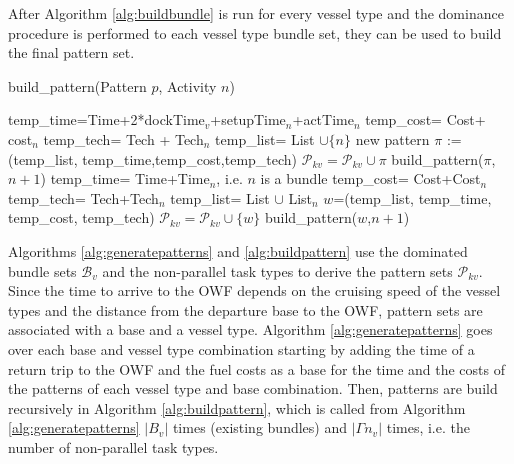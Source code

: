After Algorithm \ref{alg:buildbundle} is run for every vessel type and the dominance procedure is performed to each vessel type bundle set, they can be used to build the final pattern set. 
\begin{algorithm}[h]
	\caption{build\_pattern(Pattern $p$, Activity $n$)}
	\label{alg:buildpattern}
	\begin{algorithmic}
		\medskip
		\STATE temp\_time=Time+2*dockTime$_v$+setupTime$_n$+actTime$_n$
		\STATE temp\_cost= Cost+ cost$_n$
		\STATE temp\_tech= Tech + Tech$_n$
		\STATE temp\_list= List $\cup \{n\}$
		\STATE new pattern $\pi$ := (temp\_list, temp\_time,temp\_cost,temp\_tech)
		\STATE $\mathcal{P}_{kv}= \mathcal{P}_{kv}\cup \pi$ 
		\STATE build\_pattern($\pi$,$n+1$)
		\ENDIF
		\ELSE 
		\STATE temp\_time= Time+Time$_n$, i.e. $n$ is a bundle
		\STATE temp\_cost= Cost+Cost$_n$
		\STATE temp\_tech= Tech+Tech$_n$
		\STATE temp\_list= List $\cup$ List$_n$
		\STATE $w$=(temp\_list, temp\_time, temp\_cost, temp\_tech)
		\STATE $\mathcal{P}_{kv}= \mathcal{P}_{kv}\cup \{w\}$
		\STATE build\_pattern($w$,$n+1$)
		\ENDIF
		\ENDIF
	\end{algorithmic}
\end{algorithm}
Algorithms \ref{alg:generatepatterns} and \ref{alg:buildpattern} use the dominated bundle sets $\mathcal B_v$ and the non-parallel task types to derive the pattern sets $\mathcal P_{kv}$. Since the time to arrive to the OWF depends on the cruising speed of the vessel types and the distance from the departure base to the OWF, pattern sets are associated with a base and a vessel type. Algorithm \ref{alg:generatepatterns} goes over each base and vessel type combination starting by adding the time of a return trip to the OWF and the fuel costs as a base for the time and the costs of the patterns of each vessel type and base combination. Then, patterns are build recursively in Algorithm \ref{alg:buildpattern}, which is called from Algorithm \ref{alg:generatepatterns} $|B_v|$ times (existing bundles) and $|\Gamma n_v|$ times, i.e. the number of non-parallel task types.





